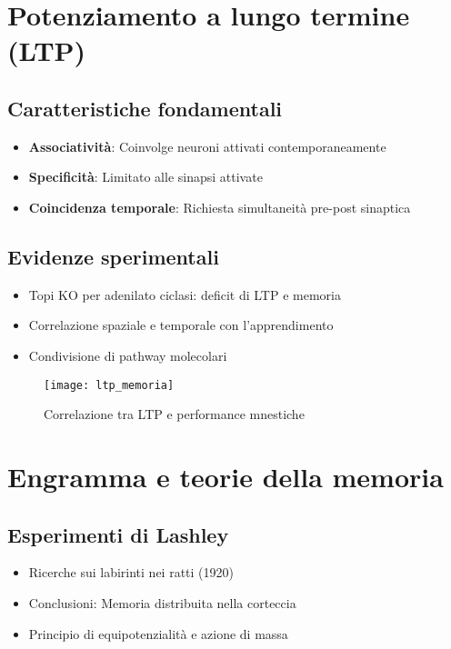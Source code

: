 \documentclass[11pt]{article}
\begin{document}
\section*{Potenziamento a lungo termine (LTP)}

\subsection*{Caratteristiche fondamentali}
\begin{itemize}
    \item \textbf{Associatività}: Coinvolge neuroni attivati contemporaneamente
    \item \textbf{Specificità}: Limitato alle sinapsi attivate
    \item \textbf{Coincidenza temporale}: Richiesta simultaneità pre-post sinaptica
\end{itemize}

\subsection*{Evidenze sperimentali}
\begin{itemize}
    \item Topi KO per adenilato ciclasi: deficit di LTP e memoria
    \item Correlazione spaziale e temporale con l'apprendimento
    \item Condivisione di pathway molecolari
\end{itemize}

\begin{figure}[h]
    \centering
    \texttt{[image: ltp\_memoria]} %
    \caption{Correlazione tra LTP e performance mnestiche}
    \label{fig:ltp}
\end{figure}

\section*{Engramma e teorie della memoria}

\subsection*{Esperimenti di Lashley}
\begin{itemize}
    \item Ricerche sui labirinti nei ratti (1920)
    \item Conclusioni: Memoria distribuita nella corteccia
    \item Principio di equipotenzialità e azione di massa
\end{itemize}
\end{document}
